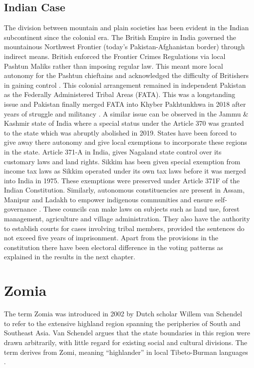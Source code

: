 \begin{sloppypar}
\subsection{Indian Case}
The division between mountain and plain societies has been evident in the Indian subcontinent since the colonial era. The British Empire in India governed the mountainous Northwest Frontier (today’s Pakistan-Afghanistan border) through indirect means. British enforced the Frontier Crimes Regulations via local Pashtun Maliks rather than imposing regular law. This meant more local autonomy for the Pashtun chieftains and acknowledged the difficulty of Britishers in gaining control \citep{ali2013indigenous}. This colonial arrangement remained in independent Pakistan as the Federally Administered Tribal Areas (FATA). This was a longstanding issue and  Pakistan finally merged FATA into Khyber Pakhtunkhwa in 2018 after years of struggle and militancy \citep{horgan2008leaving}. A similar issue can be observed in the Jammu \& Kashmir state of India where a special status under the Article 370 was granted to the state which was abruptly abolished in 2019. States have been forced to give away there autonomy and give local exemptions to incorporate these regions in the state. Article 371-A in India, gives Nagaland state control over its customary laws and land rights. Sikkim has been given special exemption from income tax laws as Sikkim operated under its own tax laws before it was merged into India in 1975. These exemptions were preserved under Article 371F of the Indian Constitution. Similarly, autonomous constituencies are present in  Assam, Manipur and Ladakh to empower indigenous communities and ensure self-governance \citep{sixthschedule}. These councils can make laws on subjects such as land use, forest management, agriculture and village administration. They also have the authority to establish courts for cases involving tribal members, provided the sentences do not exceed five years of imprisonment. Apart from the provisions in the constitution there have been electoral difference in the voting patterns as explained in the results in the next chapter. 

\section{Zomia}
The term Zomia was introduced in 2002 by Dutch scholar Willem van Schendel to refer to the extensive highland region spanning the peripheries of South and Southeast Asia. Van Schendel argues that the state boundaries in this region were drawn arbitrarily, with little regard for existing social and cultural divisions. The term derives from Zomi, meaning “highlander” in local Tibeto-Burman languages \citep{van2005geographies}. 


\end{sloppypar}
